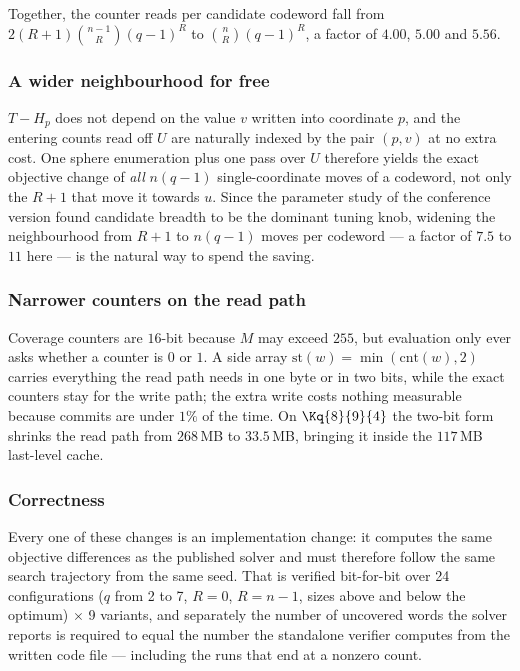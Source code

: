 Together, the counter reads per candidate codeword fall from
$2(R+1)\binom{n-1}{R}(q-1)^R$ to $\binom{n}{R}(q-1)^R$, a factor of $4.00$,
$5.00$ and $5.56$.

\subsubsection*{A wider neighbourhood for free}

$T-H_p$ does not depend on the value $v$ written into coordinate $p$, and the
entering counts read off $U$ are naturally indexed by the pair $(p,v)$ at no
extra cost. One sphere enumeration plus one pass over $U$ therefore yields the
exact objective change of \emph{all} $n(q-1)$ single-coordinate moves of a
codeword, not only the $R+1$ that move it towards $u$. Since the parameter
study of the conference version found candidate breadth to be the dominant
tuning knob, widening the neighbourhood from $R+1$ to $n(q-1)$ moves per
codeword --- a factor of $7.5$ to $11$ here --- is the natural way to spend
the saving.

\subsubsection*{Narrower counters on the read path}

Coverage counters are $16$-bit because $M$ may exceed $255$, but evaluation
only ever asks whether a counter is $0$ or $1$. A side array
$\mathrm{st}(w)=\min(\mathrm{cnt}(w),2)$ carries everything the read path needs
in one byte or in two bits, while the exact counters stay for the write path;
the extra write costs nothing measurable because commits are under $1\%$ of the
time. On $\Kq{8}{9}{4}$ the two-bit form shrinks the read path from $268$\,MB
to $33.5$\,MB, bringing it inside the $117$\,MB last-level cache.

\subsubsection*{Correctness}

Every one of these changes is an implementation change: it computes the same
objective differences as the published solver and must therefore follow the
same search trajectory from the same seed. That is verified bit-for-bit over
24 configurations ($q$ from 2 to 7, $R=0$, $R=n-1$, sizes above and below the
optimum) $\times$ 9 variants, and separately the number of uncovered words the
solver reports is required to equal the number the standalone verifier
computes from the written code file --- including the runs that end at a
nonzero count.

